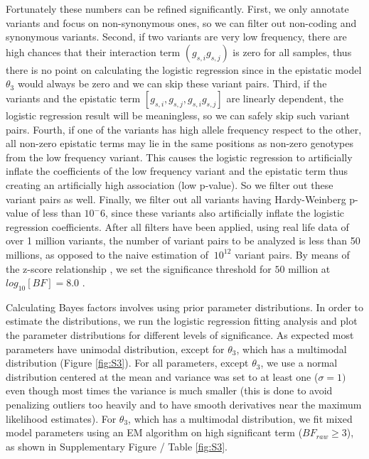 Fortunately these numbers can be refined significantly. First, we only annotate variants and focus on non-synonymous ones, so we can filter out non-coding and synonymous variants. Second, if two variants are very low frequency, there are high chances that their interaction term $(g_{s,i} g_{s,j})$ is zero for all samples, thus there is no point on calculating the logistic regression since in the epistatic model $\theta_3$ would always be zero and we can skip these variant pairs. Third, if the variants and the epistatic term $[g_{s,i}, g_{s,j}, g_{s,i} g_{s,j}]$ are linearly dependent, the logistic regression result will be meaningless, so we can safely skip such variant pairs. Fourth, if one of the variants has high allele frequency respect to the other, all non-zero epistatic terms may lie in the same positions as non-zero genotypes from the low frequency variant. This causes the logistic regression to artificially inflate the coefficients of the low frequency variant and the epistatic term thus creating an artificially high association (low p-value). So we filter out these variant pairs as well. Finally, we filter out all variants having Hardy-Weinberg p-value of less than $10^-6$, since these variants also artificially inflate the logistic regression coefficients. After all filters have been applied, using real life data of over 1 million variants, the number of variant pairs to be analyzed is less than 50 millions, as opposed to the naive estimation of $~10^{12}$ variant pairs. By means of the z-score relationship \cite{goodman1999toward}, we set the significance threshold for $50$ million at $log_{10}[BF] =  8.0$ .

Calculating Bayes factors involves using prior parameter distributions. In order to estimate the distributions, we run the logistic regression fitting analysis and plot the parameter distributions for different levels of significance. As expected most parameters have unimodal distribution, except for $\theta_3$, which has a multimodal distribution (Figure \ref{fig:S3}). For all parameters, except $\theta_3$, we use a normal distribution centered at the mean and variance was set to at least one ($\sigma=1)$ even though most times the variance is much smaller (this is done to avoid penalizing outliers too heavily and to have smooth derivatives near the maximum likelihood estimates). For $\theta_3$, which has a multimodal distribution, we fit mixed model parameters using an EM algorithm on high significant term ($BF_{raw} \ge 3$), as shown in Supplementary Figure / Table \ref{fig:S3}. 

